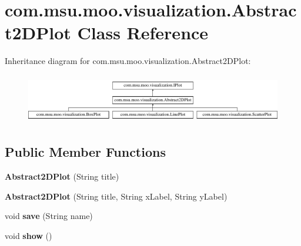 \hypertarget{classcom_1_1msu_1_1moo_1_1visualization_1_1Abstract2DPlot}{\section{com.\-msu.\-moo.\-visualization.\-Abstract2\-D\-Plot Class Reference}
\label{classcom_1_1msu_1_1moo_1_1visualization_1_1Abstract2DPlot}
}
Inheritance diagram for com.\-msu.\-moo.\-visualization.\-Abstract2\-D\-Plot\-:\begin{figure}[H]
\begin{center}
\leavevmode
\includegraphics[height=2.178988cm]{classcom_1_1msu_1_1moo_1_1visualization_1_1Abstract2DPlot}
\end{center}
\end{figure}
\subsection*{Public Member Functions}
\begin{DoxyCompactItemize}
\item 
\hypertarget{classcom_1_1msu_1_1moo_1_1visualization_1_1Abstract2DPlot_af20d6a02952b9b49e4b44f98a2855dc3}{{\bfseries Abstract2\-D\-Plot} (String title)}\label{classcom_1_1msu_1_1moo_1_1visualization_1_1Abstract2DPlot_af20d6a02952b9b49e4b44f98a2855dc3}

\item 
\hypertarget{classcom_1_1msu_1_1moo_1_1visualization_1_1Abstract2DPlot_af5135db46cd94a13fcd97473e62651ac}{{\bfseries Abstract2\-D\-Plot} (String title, String x\-Label, String y\-Label)}\label{classcom_1_1msu_1_1moo_1_1visualization_1_1Abstract2DPlot_af5135db46cd94a13fcd97473e62651ac}

\item 
\hypertarget{classcom_1_1msu_1_1moo_1_1visualization_1_1Abstract2DPlot_a1b2666e725e73d52d01928fbc129b189}{void {\bfseries save} (String name)}\label{classcom_1_1msu_1_1moo_1_1visualization_1_1Abstract2DPlot_a1b2666e725e73d52d01928fbc129b189}

\item 
\hypertarget{classcom_1_1msu_1_1moo_1_1visualization_1_1Abstract2DPlot_a75fa89c65b4a3c5e71cccf5fd9c39286}{void {\bfseries show} ()}\label{classcom_1_1msu_1_1moo_1_1visualization_1_1Abstract2DPlot_a75fa89c65b4a3c5e71cccf5fd9c39286}

\end{DoxyCompactItemize}
